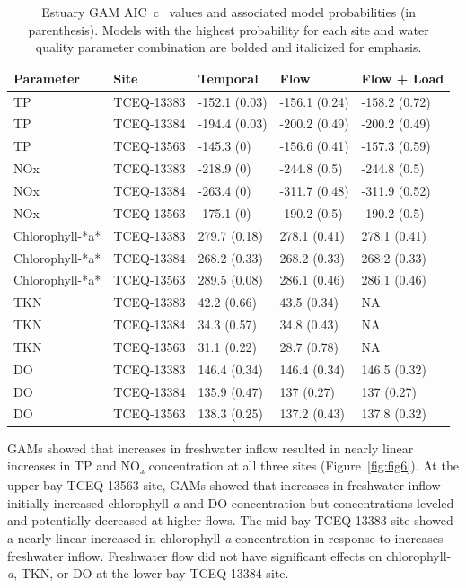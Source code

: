 \documentclass[sn-basic,referee,lineno,pdflatex]{sn-jnl}
\begin{document}
\begin{table}

\caption{\label{tab:table4}Estuary GAM AIC~c~ values and associated model probabilities (in parenthesis). Models with the highest probability for each site and water quality parameter combination are bolded and italicized for emphasis.}
\centering
\begin{tabular}[t]{lllll}
\toprule
Parameter & Site & Temporal & Flow & Flow + Load\\
\midrule
TP & TCEQ-13383 & -152.1 (0.03) & -156.1 (0.24) & -158.2 (0.72)\\
TP & TCEQ-13384 & -194.4 (0.03) & -200.2 (0.49) & -200.2 (0.49)\\
TP & TCEQ-13563 & -145.3 (0) & -156.6 (0.41) & -157.3 (0.59)\\
NOx & TCEQ-13383 & -218.9 (0) & -244.8 (0.5) & -244.8 (0.5)\\
NOx & TCEQ-13384 & -263.4 (0) & -311.7 (0.48) & -311.9 (0.52)\\
\addlinespace
NOx & TCEQ-13563 & -175.1 (0) & -190.2 (0.5) & -190.2 (0.5)\\
Chlorophyll-*a* & TCEQ-13383 & 279.7 (0.18) & 278.1 (0.41) & 278.1 (0.41)\\
Chlorophyll-*a* & TCEQ-13384 & 268.2 (0.33) & 268.2 (0.33) & 268.2 (0.33)\\
Chlorophyll-*a* & TCEQ-13563 & 289.5 (0.08) & 286.1 (0.46) & 286.1 (0.46)\\
TKN & TCEQ-13383 & 42.2 (0.66) & 43.5 (0.34) & NA\\
\addlinespace
TKN & TCEQ-13384 & 34.3 (0.57) & 34.8 (0.43) & NA\\
TKN & TCEQ-13563 & 31.1 (0.22) & 28.7 (0.78) & NA\\
DO & TCEQ-13383 & 146.4 (0.34) & 146.4 (0.34) & 146.5 (0.32)\\
DO & TCEQ-13384 & 135.9 (0.47) & 137 (0.27) & 137 (0.27)\\
DO & TCEQ-13563 & 138.3 (0.25) & 137.2 (0.43) & 137.8 (0.32)\\
\bottomrule
\end{tabular}
\end{table}

GAMs showed that increases in freshwater inflow resulted in nearly
linear increases in TP and NO\textsubscript{\emph{x}} concentration at
all three sites (Figure~\ref{fig:fig6}). At the upper-bay TCEQ-13563
site, GAMs showed that increases in freshwater inflow initially
increased chlorophyll-\emph{a} and DO concentration but concentrations
leveled and potentially decreased at higher flows. The mid-bay
TCEQ-13383 site showed a nearly linear increased in chlorophyll-\emph{a}
concentration in response to increases freshwater inflow. Freshwater
flow did not have significant effects on chlorophyll-\emph{a}, TKN, or
DO at the lower-bay TCEQ-13384 site.
\end{document}
